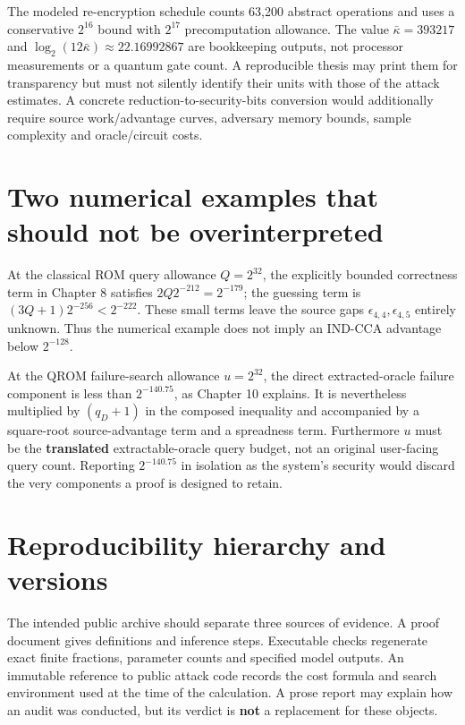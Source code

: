 \documentclass[
  11pt,
  a4paper,
  oneside]{report}
\begin{document}
The modeled re-encryption schedule counts 63,200 abstract operations and
uses a conservative \(2^{16}\) bound with \(2^{17}\) precomputation
allowance. The value \(\bar\kappa=393217\) and
\(\log_2(12\bar\kappa)\approx22.16992867\) are bookkeeping outputs, not
processor measurements or a quantum gate count. A reproducible thesis
may print them for transparency but must not silently identify their
units with those of the attack estimates. A concrete
reduction-to-security-bits conversion would additionally require source
work/advantage curves, adversary memory bounds, sample complexity and
oracle/circuit costs.

\section{Two numerical examples that should not be
overinterpreted}\label{two-numerical-examples-that-should-not-be-overinterpreted}

At the classical ROM query allowance \(Q=2^{32}\), the explicitly
bounded correctness term in Chapter 8 satisfies \(2Q2^{-212}=2^{-179}\);
the guessing term is \((3Q+1)2^{-256}<2^{-222}\). These small terms
leave the source gaps \(\epsilon_{4,4},\epsilon_{4,5}\) entirely
unknown. Thus the numerical example does not imply an IND-CCA advantage
below \(2^{-128}\).

At the QROM failure-search allowance \(u=2^{32}\), the direct
extracted-oracle failure component is less than \(2^{-140.75}\), as
Chapter 10 explains. It is nevertheless multiplied by \((q_D+1)\) in the
composed inequality and accompanied by a square-root source-advantage
term and a spreadness term. Furthermore \(u\) must be the
\textbf{translated} extractable-oracle query budget, not an original
user-facing query count. Reporting \(2^{-140.75}\) in isolation as the
system's security would discard the very components a proof is designed
to retain.

\section{Reproducibility hierarchy and
versions}\label{reproducibility-hierarchy-and-versions}

The intended public archive should separate three sources of evidence. A
proof document gives definitions and inference steps. Executable checks
regenerate exact finite fractions, parameter counts and specified model
outputs. An immutable reference to public attack code records the cost
formula and search environment used at the time of the calculation. A
prose report may explain how an audit was conducted, but its verdict is
\textbf{not} a replacement for these objects.
\end{document}
